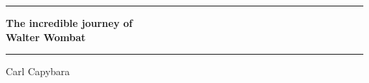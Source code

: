 \documentclass{article}
\begin{document}
\begin{center}
	\setlength{\parskip}{2ex}
\rule{\textwidth}{.4pt}\par
{\huge\bfseries The incredible journey of \\Walter Wombat \par}
\rule{\textwidth}{.4pt}\par
\bigbreak
{\Large Carl Capybara\par}
\end{center}
\end{document}
